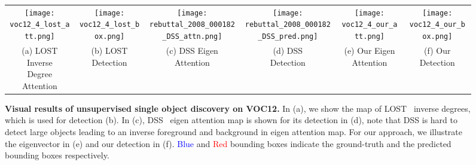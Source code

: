 \documentclass[twocolumn]{article}
\begin{document}
\begin{figure*}[!t]
\begin{tabular}{c@{\hskip 1.3pt}c@{\hskip 1.3pt}c@{\hskip 1.3pt}c@{\hskip 1.3pt}c@{\hskip 1.3pt}c}
        \texttt{[image: voc12\_4\_lost\_att.png]} &
		\texttt{[image: voc12\_4\_lost\_box.png]} &
        \texttt{[image: rebuttal\_2008\_000182\_DSS\_attn.png]} &
		\texttt{[image: rebuttal\_2008\_000182\_DSS\_pred.png]} &
		\texttt{[image: voc12\_4\_our\_att.png]} &
		\texttt{[image: voc12\_4\_our\_box.png]} \\
		\makecell{(a) LOST Inverse \\ Degree Attention}  & \makecell{(b) LOST \\ Detection} & \makecell{(c) DSS Eigen\\ Attention} & \makecell{(d) DSS \\ Detection} & \makecell{(e) Our Eigen \\Attention} & \makecell{(f) Our \\Detection} \\
\end{tabular}
\caption{\textbf{Visual results of unsupervised single object discovery on VOC12.} In (a), we show the map of LOST~\cite{simeoni2021localizing} inverse degrees, which is used for detection (b). In (c), DSS~\cite{melaskyriazi2022deep} eigen attention map is shown for its detection in (d), note that DSS is hard to detect large objects leading to an inverse foreground and background in eigen attention map. For our approach, we illustrate the eigenvector in (e) and our detection in (f). \textcolor{blue}{Blue} and \textcolor{red}{Red} bounding boxes indicate the ground-truth and the predicted bounding boxes respectively. }
\label{fig:visual_res}
\end{figure*}



		
		
		
\end{document}
